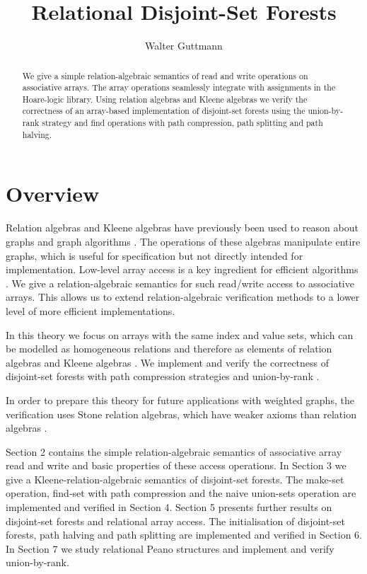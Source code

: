 \documentclass[11pt,a4paper]{article}
\begin{document}
\title{Relational Disjoint-Set Forests}
\author{Walter Guttmann}
\maketitle

\begin{abstract}
  We give a simple relation-algebraic semantics of read and write operations on associative arrays.
  The array operations seamlessly integrate with assignments in the Hoare-logic library.
  Using relation algebras and Kleene algebras we verify the correctness of an array-based implementation of disjoint-set forests using the union-by-rank strategy and find operations with path compression, path splitting and path halving.
\end{abstract}

\tableofcontents

\section{Overview}

Relation algebras and Kleene algebras have previously been used to reason about graphs and graph algorithms \cite{BackhouseCarre1975,Berghammer1999,BerghammerStruth2010,BerghammerKargerWolf1998,GondranMinoux2008,HoefnerMoeller2012,Moeller1993}.
The operations of these algebras manipulate entire graphs, which is useful for specification but not directly intended for implementation.
Low-level array access is a key ingredient for efficient algorithms \cite{CormenLeisersonRivest1990}.
We give a relation-algebraic semantics for such read/write access to associative arrays.
This allows us to extend relation-algebraic verification methods to a lower level of more efficient implementations.

In this theory we focus on arrays with the same index and value sets, which can be modelled as homogeneous relations and therefore as elements of relation algebras and Kleene algebras \cite{Kozen1994,Tarski1941}.
We implement and verify the correctness of disjoint-set forests with path compression strategies and union-by-rank \cite{CormenLeisersonRivest1990,GallerFisher1964,Tarjan1975}.

In order to prepare this theory for future applications with weighted graphs, the verification uses Stone relation algebras, which have weaker axioms than relation algebras \cite{Guttmann2018c}.

Section 2 contains the simple relation-algebraic semantics of associative array read and write and basic properties of these access operations.
In Section 3 we give a Kleene-relation-algebraic semantics of disjoint-set forests.
The make-set operation, find-set with path compression and the naive union-sets operation are implemented and verified in Section 4.
Section 5 presents further results on disjoint-set forests and relational array access.
The initialisation of disjoint-set forests, path halving and path splitting are implemented and verified in Section 6.
In Section 7 we study relational Peano structures and implement and verify union-by-rank.
\end{document}
